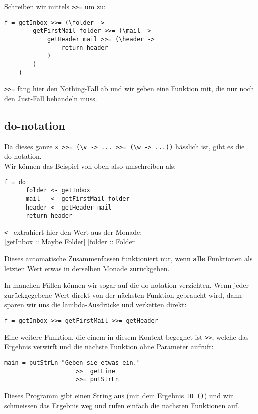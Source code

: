\documentclass{beamer}
\begin{document}
\begin{frame}[fragile]
Schreiben wir mittels \texttt{>>=} um zu:
\pause
\begin{verbatim}
f = getInbox >>= (\folder ->
        getFirstMail folder >>= (\mail ->
            getHeader mail >>= (\header ->
                return header
            )
        )
    )
\end{verbatim}
\pause
\texttt{>>=} fäng hier den Nothing-Fall ab und wir geben eine Funktion mit, die nur noch den Just-Fall behandeln muss.
\end{frame}

\subsection{do-notation}
\begin{frame}[fragile]
Da dieses ganze \texttt{x >>= (\textbackslash v -> ... >>= (\textbackslash w -> ...))} hässlich ist, gibt es die do-notation.\\
Wir können das Beispiel von oben also umschreiben als:
\pause
\begin{verbatim}
f = do
      folder <- getInbox
      mail   <- getFirstMail folder
      header <- getHeader mail
      return header
\end{verbatim}
\pause
\texttt{<-} extrahiert hier den Wert \glqq aus der Monade\grqq :\\
|getInbox :: Maybe Folder|
|folder   :: Folder      |
\pause
\begin{important}Dieses automatische Zusammenfassen funktioniert nur, wenn \textbf{alle} Funktionen als letzten Wert etwas in derselben Monade zurückgeben.\end{important}
\end{frame}

\begin{frame}[fragile]
In manchen Fällen können wir sogar auf die do-notation verzichten. Wenn jeder zurückgegebene Wert direkt von der nächsten Funktion gebraucht wird, dann sparen wir uns die lambda-Ausdrücke und verketten direkt:
\pause
\begin{verbatim}
f = getInbox >>= getFirstMail >>= getHeader
\end{verbatim}
\pause
Eine weitere Funktion, die einem in diesem Kontext begegnet ist \texttt{>>}, welche das Ergebnis verwirft und die nächste Funktion ohne Parameter aufruft:
\begin{verbatim}
main = putStrLn "Geben sie etwas ein."
                    >>  getLine 
                    >>= putStrLn
\end{verbatim}
\pause
Dieses Programm gibt einen String aus (mit dem Ergebnis \texttt{IO ()}) und wir schmeissen das Ergebnis weg und rufen einfach die nächsten Funktionen auf.
\end{frame}
\end{document}
